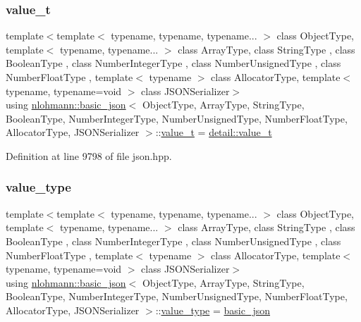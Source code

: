 \subsubsection{\texorpdfstring{value\+\_\+t}{value\_t}}
{\footnotesize\ttfamily template$<$template$<$ typename, typename, typename... $>$ class Object\+Type, template$<$ typename, typename... $>$ class Array\+Type, class String\+Type , class Boolean\+Type , class Number\+Integer\+Type , class Number\+Unsigned\+Type , class Number\+Float\+Type , template$<$ typename $>$ class Allocator\+Type, template$<$ typename, typename=void $>$ class J\+S\+O\+N\+Serializer$>$ \\
using \hyperlink{classnlohmann_1_1basic__json}{nlohmann\+::basic\+\_\+json}$<$ Object\+Type, Array\+Type, String\+Type, Boolean\+Type, Number\+Integer\+Type, Number\+Unsigned\+Type, Number\+Float\+Type, Allocator\+Type, J\+S\+O\+N\+Serializer $>$\+::\hyperlink{namespacenlohmann_1_1detail_a1ed8fc6239da25abcaf681d30ace4985}{value\+\_\+t} =  \hyperlink{namespacenlohmann_1_1detail_a1ed8fc6239da25abcaf681d30ace4985}{detail\+::value\+\_\+t}}



Definition at line 9798 of file json.\+hpp.

\mbox{\label{classnlohmann_1_1basic__json_a2b3297873b70c080837e8eedc4fec32f}} 
\subsubsection{\texorpdfstring{value\+\_\+type}{value\_type}}
{\footnotesize\ttfamily template$<$template$<$ typename, typename, typename... $>$ class Object\+Type, template$<$ typename, typename... $>$ class Array\+Type, class String\+Type , class Boolean\+Type , class Number\+Integer\+Type , class Number\+Unsigned\+Type , class Number\+Float\+Type , template$<$ typename $>$ class Allocator\+Type, template$<$ typename, typename=void $>$ class J\+S\+O\+N\+Serializer$>$ \\
using \hyperlink{classnlohmann_1_1basic__json}{nlohmann\+::basic\+\_\+json}$<$ Object\+Type, Array\+Type, String\+Type, Boolean\+Type, Number\+Integer\+Type, Number\+Unsigned\+Type, Number\+Float\+Type, Allocator\+Type, J\+S\+O\+N\+Serializer $>$\+::\hyperlink{classnlohmann_1_1basic__json_a2b3297873b70c080837e8eedc4fec32f}{value\+\_\+type} =  \hyperlink{classnlohmann_1_1basic__json}{basic\+\_\+json}}



